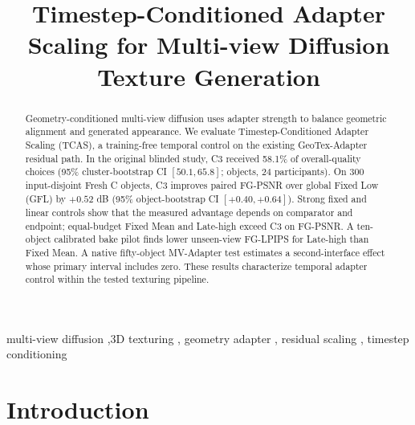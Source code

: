 \documentclass[times,twocolumn,final]{elsarticle}
\providecommand{\DIFadd}[1]{{\protect\color{blue} \sf #1}} %
\providecommand{\DIFaddbegin}{} %
\providecommand{\DIFaddend}{} %
\begin{document}
\begin{frontmatter}

\title{Timestep-Conditioned Adapter Scaling for Multi-view Diffusion Texture Generation}


\begin{abstract}
  \DIFaddbegin \DIFadd{Geometry-conditioned multi-view diffusion uses adapter strength to balance geometric alignment and generated appearance. We evaluate }\DIFaddend Timestep-Conditioned Adapter Scaling (TCAS), a training-free   \DIFaddbegin \DIFadd{temporal control on the existing GeoTex-Adapter residual path. In the original blinded study, }\DIFaddend C3   \DIFaddbegin \DIFadd{received 58.1\% of overall-quality choices (95\% cluster-bootstrap CI $[50.1,65.8]$}\DIFaddend ;   \DIFaddbegin \DIFadd{30 objects, 24 participants). On 300 input-disjoint Fresh C objects, C3 improves paired FG-PSNR over global Fixed Low (GFL) by $+0.52$ dB (95\% object-bootstrap CI $[+0.40,+0.64]$). Strong fixed and linear controls show that the measured advantage depends on comparator and endpoint; equal-budget Fixed Mean and Late-high exceed C3 on FG-PSNR. A ten-object calibrated bake pilot finds lower unseen-view FG-LPIPS for Late-high than Fixed Mean. A native fifty-object MV-Adapter test estimates a second-interface effect whose primary interval includes zero}\DIFaddend . These results   \DIFaddbegin \DIFadd{characterize temporal adapter control }\DIFaddend within the tested   \DIFaddbegin \DIFadd{texturing pipeline}\DIFaddend .
\end{abstract}

\begin{keyword}
\KWD
multi-view diffusion   \sep 3D   \DIFaddbegin \DIFadd{texturing }\DIFaddend \sep   \DIFaddbegin \DIFadd{geometry adapter }\DIFaddend \sep   \DIFaddbegin \DIFadd{residual }\DIFaddend scaling \sep   \DIFaddbegin \DIFadd{timestep conditioning
}\DIFaddend \end{keyword}

\end{frontmatter}

\linenumbers

\section{Introduction}
\label{sec:intro}
\end{document}
